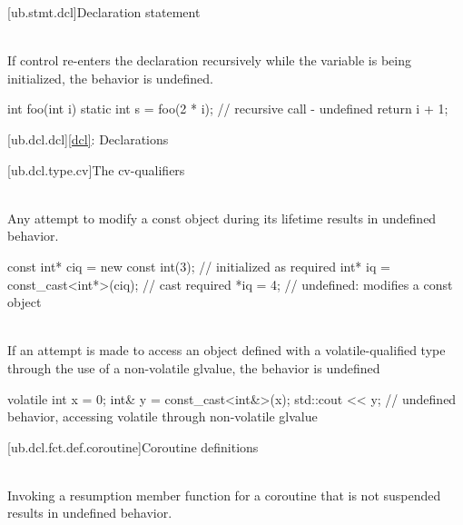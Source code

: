 [ub.stmt.dcl]{Declaration statement}

\pnum
{} \\
If control re-enters the declaration recursively while the
variable is being initialized, the behavior is undefined.

\pnum
\begin{example}
\begin{codeblock}
int foo(int i) {
  static int s = foo(2 * i);    // recursive call - undefined
  return i + 1;
}
\end{codeblock}
\end{example}




[ub.dcl.dcl]{\ref{dcl}: Declarations}

[ub.dcl.type.cv]{The cv-qualifiers}

\pnum
{} \\
Any attempt to modify a const object during its lifetime results in
undefined behavior.

\pnum
\begin{example}
\begin{codeblock}
const int* ciq = new const int(3);  // initialized as required
int* iq = const_cast<int*>(ciq);    // cast required
*iq = 4;                            // undefined: modifies a const object
\end{codeblock}
\end{example}


\pnum
{} \\
If an attempt is made to
access an object defined with a volatile-qualified type through the use of a non-volatile glvalue, the behavior
is undefined

\pnum
\begin{example}
\begin{codeblock}
volatile int x = 0;
int& y = const_cast<int&>(x);
std::cout << y;         // undefined behavior, accessing volatile through non-volatile glvalue
\end{codeblock}
\end{example}


[ub.dcl.fct.def.coroutine]{Coroutine definitions}

\pnum
{} \\
Invoking a resumption member function for a coroutine that is not suspended results in undefined behavior.

